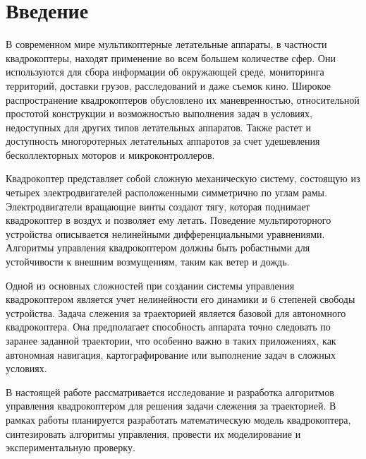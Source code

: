 \chapter*{Введение}
\label{ch:chap1}



В современном мире мультикоптерные летательные аппараты, 
в частности квадрокоптеры, находят применение во всем большем количестве 
сфер. Они используются для сбора информации об окружающей 
среде, мониторинга территорий, доставки грузов, расследований
и даже съемок кино. 
Широкое распространение квадрокоптеров обусловлено 
их маневренностью, относительной простотой конструкции и 
возможностью выполнения задач в условиях, недоступных 
для других типов летательных аппаратов. Также растет и доступность многоротерных 
летательных аппаротов за счет удешевления бесколлекторных моторов и микроконтроллеров. 


Квадрокоптер представляет собой сложную механическую систему, состоящую из 
четырех электродвигателей расположенными симметрично по углам рамы. 
Электродвигатели вращающие винты создают тягу, которая поднимает квадрокоптер
в воздух и позволяет ему летать. 
Поведение мультироторного устройства описывается нелинейными дифференциальными 
уравнениями. 
Алгоритмы управления квадрокоптером должны быть робастными для устойчивости 
к внешним возмущениям, таким как ветер и дождь.


Одной из основных сложностей при создании системы управления 
квадрокоптером является учет нелинейности его динамики и 6 
степеней свободы устройства. Задача слежения за траекторией является базовой для 
автономного квадрокоптера. Она предполагает 
способность аппарата точно следовать по заранее заданной 
траектории, что особенно важно в таких приложениях, как 
автономная навигация, картографирование или выполнение задач
в сложных условиях. 




В настоящей работе рассматривается исследование и разработка 
алгоритмов управления квадрокоптером для решения задачи слежения
за траекторией. В рамках работы планируется 
разработать математическую модель квадрокоптера, 
синтезировать алгоритмы управления, провести их моделирование и 
экспериментальную проверку.
  




\endinput
